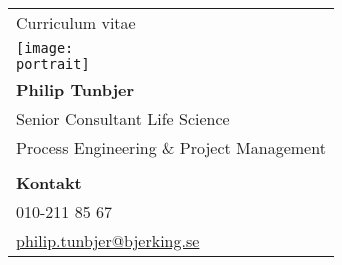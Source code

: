 \documentclass[a4paper, 10pt]{article}
\makeatletter
\newcommand{\unitdetail}{Process Engineering \& Project Management} %
\newcommand{\name}{Philip Tunbjer} %
\newcommand{\role}{Senior Consultant Life Science} %
\newcommand{\phone}{010-211 85 67} %
\newcommand{\email}{philip.tunbjer@bjerking.se} %
\newcommand{\portrait}{img/portrait.png} %
\makeatother
\begin{document}
\thispagestyle{presentation}
\pagestyle{plain}
\noindent
\begin{minipage}[t]{0.3\textwidth}
    \strut\vspace*{-\baselineskip}\newline
    \begin{tabular*}{1\linewidth}{p{1\linewidth}}
        {\LARGE Curriculum vitae}\\
        \texttt{[image: \\portrait]} \\
        \textbf{\name} \\
        \role{} \\
        \unitdetail{} \\
        \\
        \textbf{Kontakt} \\
        \phone{} \\
        \href{mailto:\email}{\email} \\
    \end{tabular*}
\end{minipage}%
\hfill
\end{document}
